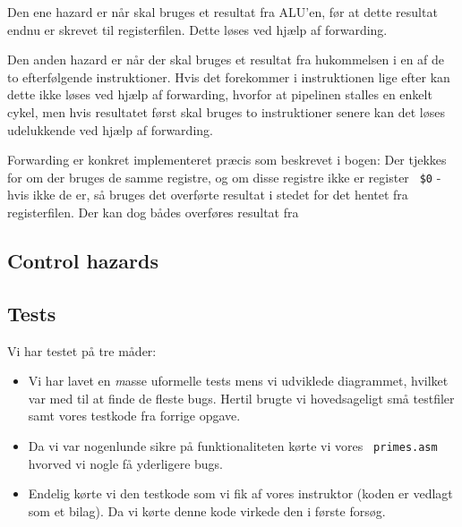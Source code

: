 Den ene hazard er når skal bruges et resultat fra ALU'en, før at dette resultat endnu er skrevet
til registerfilen. Dette løses ved hjælp af forwarding.

Den anden hazard er når der skal bruges et resultat fra hukommelsen i en af de
to efterfølgende instruktioner. Hvis det forekommer i instruktionen lige efter
kan dette ikke løses ved hjælp af forwarding, hvorfor at pipelinen stalles en
enkelt cykel, men hvis resultatet først skal bruges to instruktioner senere kan
det løses udelukkende ved hjælp af forwarding.

Forwarding er konkret implementeret præcis som beskrevet i bogen: Der tjekkes
for om der bruges de samme registre, og om disse registre ikke er register {\tt
\$0} - hvis ikke de er, så bruges det overførte resultat i stedet for det hentet
fra registerfilen. Der kan dog bådes overføres resultat fra 

\subsection{Control hazards}

\subsection{Tests}
Vi har testet på tre måder:
\begin{itemize}
\item Vi har lavet en {\emph masse} uformelle tests mens vi udviklede
diagrammet, hvilket var med til at finde de fleste bugs. Hertil brugte vi
hovedsageligt små testfiler samt vores testkode fra forrige opgave.
\item Da vi var nogenlunde sikre på funktionaliteten kørte vi vores {\tt
primes.asm} hvorved vi nogle få yderligere bugs.
\item Endelig kørte vi den testkode som vi fik af vores instruktor (koden er
vedlagt som et bilag). Da vi kørte denne kode virkede den i første forsøg.
\end{itemize}
